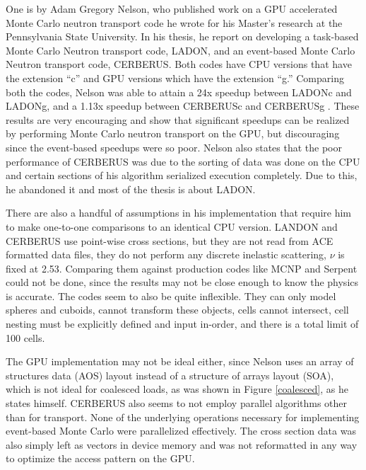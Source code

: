 One is by Adam Gregory Nelson, who published work on a GPU accelerated Monte Carlo neutron transport code he wrote for his Master's research at the Pennsylvania State University.  In his thesis, he report on developing a task-based Monte Carlo Neutron transport code, LADON, and an event-based Monte Carlo Neutron transport code, CERBERUS.  Both codes have CPU versions that have the extension ``c'' and GPU versions which have the extension ``g.''  Comparing both the codes, Nelson was able to attain a 24x speedup between LADONc and LADONg, and a 1.13x speedup between CERBERUSc and CERBERUSg \cite{nelson}.  These results are very encouraging and show that significant speedups can be realized by performing Monte Carlo neutron transport on the GPU, but discouraging since the event-based speedups were so poor.  Nelson also states that the poor performance of CERBERUS was due to the sorting of data was done on the CPU and certain sections of his algorithm serialized execution completely.  Due to this, he abandoned it and most of the thesis is about LADON.  

There are also a handful of assumptions in his implementation that require him to make one-to-one comparisons to an identical CPU version.  LANDON and CERBERUS use point-wise cross sections, but they are not read from ACE formatted data files, they do not perform any discrete inelastic scattering,  $\nu$ is fixed at 2.53.  Comparing them against production codes like MCNP and Serpent could not be done, since the results may not be close enough to know the physics is accurate.  The codes seem to also be quite inflexible.  They can only model spheres and cuboids, cannot transform these objects, cells cannot intersect, cell nesting must be explicitly defined and input in-order, and there is a total limit of 100 cells.

The GPU implementation may not be ideal either, since Nelson uses an array of structures data (AOS) layout instead of a structure of arrays layout (SOA), which is not ideal for coalesced loads, as was shown in Figure \ref{coalesced}, as he states himself.  CERBERUS also seems to not employ parallel algorithms other than for transport.  None of the underlying operations necessary for implementing event-based Monte Carlo were parallelized effectively.  The cross section data was also simply left as vectors in device memory and was not reformatted in any way to optimize the access pattern on the GPU.

